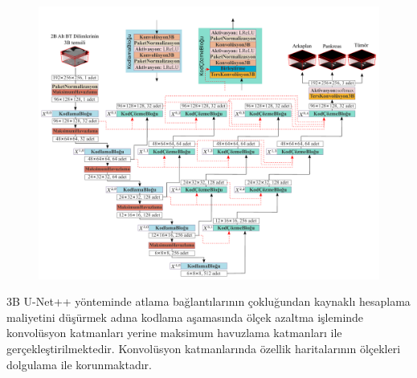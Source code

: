 \begin{figure}[h!]
	\begin{center}
		\vspace{0.4cm}
		{
			\vspace{0.4cm}
			\includegraphics[scale=0.45]{Yapilan-Calismalar/Figures/3dunet++.pdf}
		}
	\end{center}
\end{figure} 

3B U-Net++ yönteminde atlama bağlantılarının çokluğundan kaynaklı hesaplama maliyetini düşürmek adına kodlama aşamasında ölçek azaltma işleminde konvolüsyon katmanları yerine maksimum havuzlama katmanları ile gerçekleştirilmektedir. Konvolüsyon katmanlarında özellik haritalarının ölçekleri dolgulama ile korunmaktadır.

